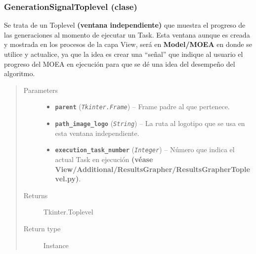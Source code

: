 \documentclass[class=report, crop=false]{standalone}
\begin{document}
\subsubsection{GenerationSignalToplevel (clase)}
\label{sec:a_3_3_1}
\begin{fulllineitems}

\begin{DUlineblock}{0em}
\item[] Se trata de un Toplevel \textbf{(ventana independiente)} que 
muestra el progreso de las generaciones al momento de ejecutar un Task.\break
Esta ventana aunque es creada y mostrada en los procesos de la capa View, 
será en \textbf{Model/MOEA} en donde se utilice y actualice, ya que la idea 
es crear una ``señal'' que indique al usuario el progreso del MOEA en 
ejecución para que se dé una idea del desempeño del algoritmo.
\end{DUlineblock}

\begin{quote}\begin{description}
\item[{Parameters}] \leavevmode\begin{itemize}
\item \textbf{\texttt{parent}} (\emph{\texttt{Tkinter.Frame}}) -- Frame padre al que pertenece.
\item \textbf{\texttt{path\_image\_logo}} (\emph{\texttt{String}}) -- La ruta al logotipo que se usa en esta ventana independiente.
\item \textbf{\texttt{execution\_task\_number}} (\emph{\texttt{Integer}}) -- Número que indica el actual Task en ejecución \textbf{(véase View/Additional/}\break\textbf{ResultsGrapher/ResultsGrapherToplevel.py)}.
\end{itemize}

\item[{Returns}] \leavevmode
Tkinter.Toplevel
\item[{Return type}] \leavevmode
Instance
\end{description}\end{quote}


\begin{fulllineitems}

~


\end{fulllineitems}
\end{fulllineitems}
\end{document}
